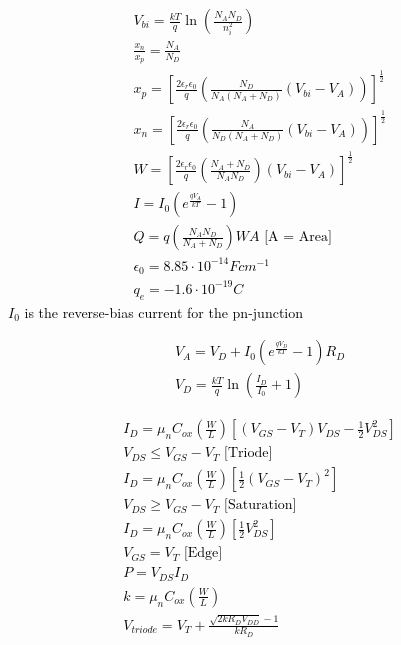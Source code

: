\documentclass[a4paper,8pt]{extarticle} %
\newcommand{\mybox}[2]{
    \begin{tcolorbox}[colback=lightblue!5!white,colframe=lightblue!75!black,boxsep=1pt,arc=0pt,outer arc=0pt,title={\textcolor{black}{#1}}]
        \textcolor{black}{#2}
    \end{tcolorbox}
}
\begin{document}
\begin{multicols}{2}
\mybox{pn Junction}{
\begin{subequations}
\begin{align}
    V_{bi} = \frac{kT}{q} \ln{\left( \frac{N_AN_D}{n_i^2} \right)} \\
    \frac{x_n}{x_p} = \frac{N_A}{N_D} \\
    x_p = \left[ \frac{2\epsilon_r\epsilon_0}{q} \left( \frac{N_D}{N_A(N_A + N_D)} (V_{bi} - V_A) \right) \right]^{\frac{1}{2}} \\
    x_n = \left[ \frac{2\epsilon_r\epsilon_0}{q} \left( \frac{N_A}{N_D(N_A + N_D)} (V_{bi} - V_A) \right) \right]^{\frac{1}{2}} \\
    W = \left[ \frac{2\epsilon_r \epsilon_0}{q} \left( \frac{N_A + N_D}{N_AN_D} \right) (V_{bi} - V_A) \right]^{\frac12} \\
    I = I_0 (e^{\frac{qV_A}{kT}} - 1) \\
    Q = q \left( \frac{N_AN_D}{N_A + N_D} \right) W A \text{      [A = Area]} \\
    \epsilon_0 = 8.85 \cdot 10^{-14} F cm^{-1} \\
    q_{e} = -1.6 \cdot 10^{-19} C
\end{align}
\end{subequations}
$I_0$ is the reverse-bias current for the pn-junction
}

\mybox{Diodes}{
\begin{subequations}
\begin{align}
    V_A = V_D + I_0(e^{\frac{qV_D}{kT}} - 1)R_D \\
    V_D = \frac{kT}{q} \ln \left( \frac{I_D}{I_0} + 1 \right)
\end{align}
\end{subequations}
}

\mybox{Transistors}{
\begin{subequations}
\begin{align}
    I_D = \mu_n C_{ox} \left( \frac{W}{L} \right) \left[ (V_{GS} - V_T)V_{DS} - \frac12 V_{DS}^2\right] \\ V_{DS} \leq V_{GS} - V_T \text{  [Triode]} \\
    I_D = \mu_n C_{ox} \left( \frac{W}{L} \right) \left[ \frac12 (V_{GS} - V_T)^2 \right] \\ V_{DS} \geq V_{GS} - V_T \text{   [Saturation]} \\
    I_D = \mu_n C_{ox} \left( \frac{W}{L} \right) \left[ \frac12 V_{DS}^2 \right] \\ V_{GS} = V_T \text{   [Edge]} \\
    P = V_{DS}I_{D} \\
    k = \mu_n C_{ox} \left(\frac{W}{L} \right) \\
    V_{triode} = V_T + \frac{\sqrt{2kR_DV_{DD}} - 1}{kR_D}
\end{align}
\end{subequations}
}


\end{multicols}
\end{document}
